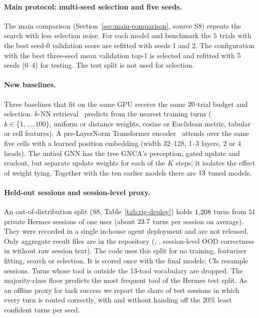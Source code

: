 \documentclass[10pt]{article}
\begin{document}
\paragraph{Main protocol: multi-seed selection and five seeds.} The main comparison (Section~\ref{sec:main-comparison}, source S8) repeats the search with less selection noise. For each model and benchmark the $5$ trials with the best seed-0 validation score are refitted with seeds 1 and 2. The configuration with the best three-seed mean validation top-1 is selected and refitted with $5$ seeds (0--4) for testing. The test split is not used for selection.
\paragraph{New baselines.} Three baselines that fit on the same GPU receive the same $20$-trial budget and selection. $k$-NN retrieval~\citep{cover1967nearest} predicts from the nearest training turns ($k\in\{1,\dots,100\}$, uniform or distance weights, cosine or Euclidean metric, tabular or cell features). A pre-LayerNorm Transformer encoder~\citep{vaswani2017attention} attends over the same five cells with a learned position embedding (width 32--128, 1--3 layers, 2 or 4 heads). The untied GNN has the tree GNCA's perception, gated update and readout, but separate update weights for each of the $K$ steps; it isolates the effect of weight tying. Together with the ten earlier models there are $13$ tuned models.
\paragraph{Held-out sessions and session-level proxy.} An out-of-distribution split (S8, Table~\ref{tab:rig-deploy}) holds $1{,}208$ turns from $51$ private Hermes sessions of one user (about $23.7$ turns per session on average). They were recorded in a single in-house agent deployment and are not released. Only aggregate result files are in the repository (\pathOodStats{}, \pathOodSummary{}, session-level OOD correctness in \pathOodPerTurn{} without raw session text). The code uses this split for no training, featuriser fitting, search or selection. It is scored once with the final models; CIs resample sessions. Turns whose tool is outside the 13-tool vocabulary are dropped. The majority-class floor predicts the most frequent tool of the Hermes test split. As an offline proxy for task success we report the share of test sessions in which every turn is routed correctly, with and without handing off the 20\% least confident turns per seed.
\end{document}
